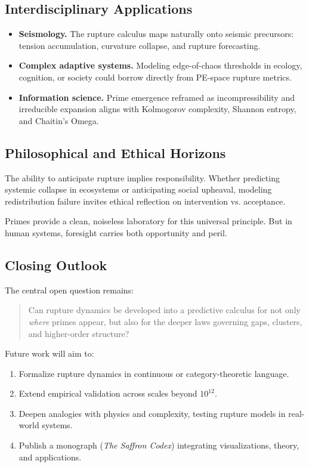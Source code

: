 \documentclass[11pt]{article}
\theoremstyle{plain}
\theoremstyle{definition}
\begin{document}
\subsection{Interdisciplinary Applications}
\begin{itemize}
  \item \textbf{Seismology.} The rupture calculus maps naturally onto seismic precursors: tension accumulation, curvature collapse, and rupture forecasting.
  \item \textbf{Complex adaptive systems.} Modeling edge-of-chaos thresholds in ecology, cognition, or society could borrow directly from PE-space rupture metrics.
  \item \textbf{Information science.} Prime emergence reframed as incompressibility and irreducible expansion aligns with Kolmogorov complexity, Shannon entropy, and Chaitin’s Omega.
\end{itemize}

\subsection{Philosophical and Ethical Horizons}
The ability to anticipate rupture implies responsibility. Whether predicting systemic collapse in ecosystems or anticipating social upheaval, modeling redistribution failure invites ethical reflection on intervention vs. acceptance.  

Primes provide a clean, noiseless laboratory for this universal principle. But in human systems, foresight carries both opportunity and peril.

\subsection{Closing Outlook}
The central open question remains:
\begin{quote}
Can rupture dynamics be developed into a predictive calculus for not only \emph{where} primes appear, but also for the deeper laws governing gaps, clusters, and higher-order structure?
\end{quote}

Future work will aim to:
\begin{enumerate}
  \item Formalize rupture dynamics in continuous or category-theoretic language.  
  \item Extend empirical validation across scales beyond $10^{12}$.  
  \item Deepen analogies with physics and complexity, testing rupture models in real-world systems.  
  \item Publish a monograph (\emph{The Saffron Codex}) integrating visualizations, theory, and applications.
\end{enumerate}
\end{document}
